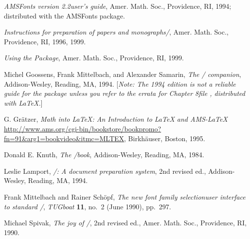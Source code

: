 \documentclass[leqno,titlepage,openany]{amsldoc}[1999/12/13]
\newcommand{\booktitle}[1]{\textit{#1}}
\newcommand{\journalname}[1]{\textit{#1}}
\begin{document}
\begin{thebibliography}{9}

\booktitle{AMSFonts version \textup{2.2}\mdash user's guide},
Amer. Math. Soc., Providence, RI, 1994; distributed
with the AMSFonts package.

\booktitle{Instructions for preparation of
papers and monographs\mdash \amslatex/},
Amer. Math. Soc., Providence, RI, 1996, 1999.

\booktitle{Using the  Package},
Amer. Math. Soc., Providence, RI, 1999.

 Michel Goossens, Frank Mittelbach, and Alexander Samarin,
\booktitle{The \latex/ companion}, Addison-Wesley, Reading, MA, 1994.
  [\emph{Note: The 1994 edition is not a reliable guide for the
     package unless you refer to the errata for Chapter
    8\mdash file , distributed with \LaTeX{}.}]

\begin{raggedright}
 G. Gr\"{a}tzer,
\emph{Math into \LaTeX{}: An Introduction to \LaTeX{} and AMS-\LaTeX{}}
  \url{http://www.ams.org/cgi-bin/bookstore/bookpromo?fn=91&arg1=bookvideo&itmc=MLTEX},
Birkh\"{a}user, Boston, 1995.\par
\end{raggedright}

 Donald E. Knuth, \booktitle{The \tex/book},
Addison-Wesley, Reading, MA, 1984.

 Leslie Lamport, \booktitle{\latex/: A document preparation
system}, 2nd revised ed., Addison-Wesley, Reading, MA, 1994.

 Frank Mittelbach and Rainer Sch\"opf,
\textit{The new font family selection\mdash user
interface to standard \latex/}, \journalname{TUGboat} \textbf{11},
no.~2 (June 1990), pp.~297.

 Michael Spivak, \booktitle{The joy of \tex/}, 2nd revised ed.,
Amer. Math. Soc., Providence, RI, 1990.

\end{thebibliography}
\end{document}
